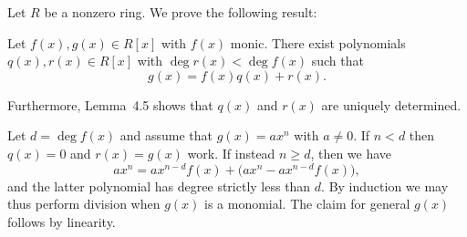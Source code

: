 \documentclass[article, a4paper, 11pt, oneside]{memoir}
\numberwithin{equation}{chapter}
\theoremstyle{nonumberplain}
\newenvironment{displaytheorem}{%
	\begin{displayquote}\itshape%
}{%
	\end{displayquote}%
}
\begin{document}
\begin{remarkbreak}
    Let $R$ be a nonzero ring. We prove the following result:
    \begin{displaytheorem}
        Let $f(x), g(x) \in R[x]$ with $f(x)$ monic. There exist polynomials $q(x), r(x) \in R[x]$ with $\deg r(x) < \deg f(x)$ such that
        \begin{equation*}
            g(x) = f(x) q(x) + r(x).
        \end{equation*}
    \end{displaytheorem}
    Furthermore, Lemma~4.5 shows that $q(x)$ and $r(x)$ are uniquely determined.

    Let $d = \deg f(x)$ and assume that $g(x) = ax^n$ with $a \neq 0$. If $n < d$ then $q(x) = 0$ and $r(x) = g(x)$ work. If instead $n \geq d$, then we have
    \begin{equation*}
        ax^n
            = ax^{n-d} f(x) + \bigl( ax^n - ax^{n-d} f(x) \bigr),
    \end{equation*}
    and the latter polynomial has degree strictly less than $d$. By induction we may thus perform division when $g(x)$ is a monomial. The claim for general $g(x)$ follows by linearity.
\end{remarkbreak}
\end{document}
